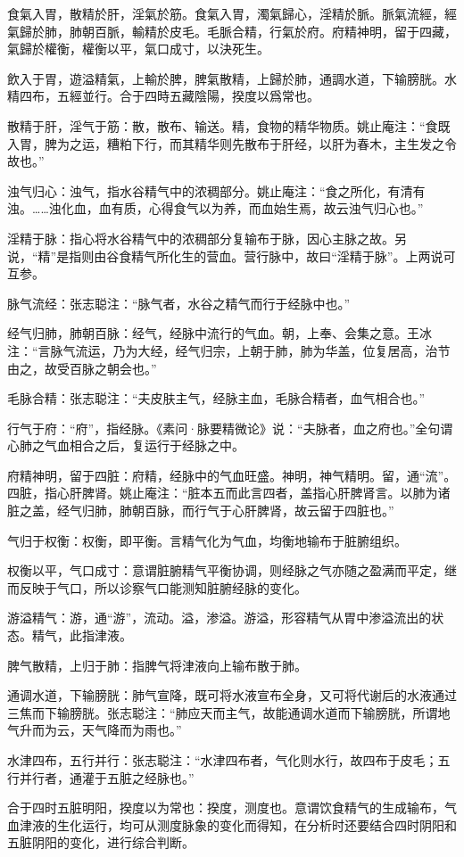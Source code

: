 \documentclass[12pt]{ctexbook}
\begin{document}

\begin{yuanwen}
食氣入胃，散精於肝，淫氣於筋。食氣入胃，濁氣歸心，淫精於脈。脈氣流經，經氣歸於肺，肺朝百脈，輸精於皮毛。毛脈合精，行氣於府。府精神明，留于四藏，氣歸於權衡，權衡以平，氣口成寸，以決死生。

飲入于胃，遊溢精氣，上輸於脾，脾氣散精，上歸於肺，通調水道，下输膀胱。水精四布，五經並行。合于四時五藏陰陽，揆度以爲常也。
\end{yuanwen}


\begin{jiaozhu}
	\item 散精于肝，淫气于筋：散，散布、输送。精，食物的精华物质。姚止庵注：“食既入胃，脾为之运，糟粕下行，而其精华则先散布于肝经，以肝为春木，主生发之令故也。”
	\item 浊气归心：浊气，指水谷精气中的浓稠部分。姚止庵注：“食之所化，有清有浊。……浊化血，血有质，心得食气以为养，而血始生焉，故云浊气归心也。”
	\item 淫精于脉：指心将水谷精气中的浓稠部分复输布于脉，因心主脉之故。另说，“精”是指则由谷食精气所化生的营血。营行脉中，故曰“淫精于脉”。上两说可互参。
	\item 脉气流经：张志聪注：“脉气者，水谷之精气而行于经脉中也。”
	\item 经气归肺，肺朝百脉：经气，经脉中流行的气血。朝，上奉、会集之意。王冰注：“言脉气流运，乃为大经，经气归宗，上朝于肺，肺为华盖，位复居高，治节由之，故受百脉之朝会也。”
	\item 毛脉合精：张志聪注：“夫皮肤主气，经脉主血，毛脉合精者，血气相合也。”
	\item 行气于府：“府”，指经脉。《素问·脉要精微论》说：“夫脉者，血之府也。”全句谓心肺之气血相合之后，复运行于经脉之中。
	\item 府精神明，留于四脏：府精，经脉中的气血旺盛。神明，神气精明。留，通“流”。四脏，指心肝脾肾。姚止庵注：“脏本五而此言四者，盖指心肝脾肾言。以肺为诸脏之盖，经气归肺，肺朝百脉，而行气于心肝脾肾，故云留于四脏也。”
	\item 气归于权衡：权衡，即平衡。言精气化为气血，均衡地输布于脏腑组织。
	\item 权衡以平，气口成寸：意谓脏腑精气平衡协调，则经脉之气亦随之盈满而平定，继而反映于气口，所以诊察气口能测知脏腑经脉的变化。
	\item 游溢精气：游，通“游”，流动。溢，渗溢。游溢，形容精气从胃中渗溢流出的状态。精气，此指津液。
	\item 脾气散精，上归于肺：指脾气将津液向上输布散于肺。
	\item 通调水道，下输膀胱：肺气宣降，既可将水液宣布全身，又可将代谢后的水液通过三焦而下输膀胱。张志聪注：“肺应天而主气，故能通调水道而下输膀胱，所谓地气升而为云，天气降而为雨也。”
	\item 水津四布，五行并行：张志聪注：“水津四布者，气化则水行，故四布于皮毛；五行并行者，通灌于五脏之经脉也。”
	\item 合于四时五脏明阳，揆度以为常也：揆度，测度也。意谓饮食精气的生成输布，气血津液的生化运行，均可从测度脉象的变化而得知，在分析时还要结合四时阴阳和五脏阴阳的变化，进行综合判断。
\end{jiaozhu}
\end{document}
